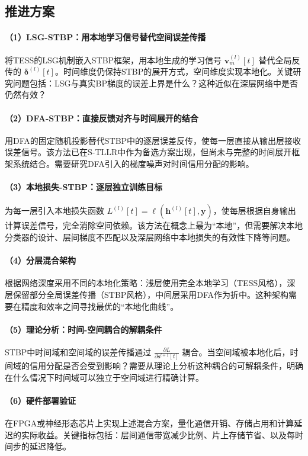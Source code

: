 \documentclass[journal,12pt,onecolumn]{IEEEtran}
\begin{document}
\subsection{推进方案}

\paragraph{（1）LSG-STBP：用本地学习信号替代空间误差传播}
将TESS的LSG机制嵌入STBP框架，用本地生成的学习信号 \(\mathbf{v}_m^{(l)}[t]\) 替代全局反传的 \(\boldsymbol{\delta}^{(l)}[t]\)。时间维度仍保持STBP的展开方式，空间维度实现本地化。关键研究问题包括：LSG与真实BP梯度的误差上界是什么？这种近似在深层网络中是否仍然有效？

\paragraph{（2）DFA-STBP：直接反馈对齐与时间展开的结合}
用DFA的固定随机投影替代STBP中的逐层误差反传，使每一层直接从输出层接收误差信号。该方法已在S-TLLR中作为备选方案出现，但尚未与完整的时间展开框架系统结合。需要研究DFA引入的梯度噪声对时间信用分配的影响。

\paragraph{（3）本地损失-STBP：逐层独立训练目标}
为每一层引入本地损失函数 \(L^{(l)}[t] = \ell(\mathbf{h}^{(l)}[t], \mathbf{y})\)，使每层根据自身输出计算误差信号，完全消除空间依赖。该方法在概念上最为“本地”，但需要解决本地分类器的设计、层间梯度不匹配以及深层网络中本地损失的有效性下降等问题。

\paragraph{（4）分层混合架构}
根据网络深度采用不同的本地化策略：浅层使用完全本地学习（TESS风格），深层保留部分全局误差传播（STBP风格），中间层采用DFA作为折中。这种架构需要在精度和效率之间寻找最优的“本地化曲线”。

\paragraph{（5）理论分析：时间-空间耦合的解耦条件}
STBP中时间域和空间域的误差传播通过 \(\frac{\partial L}{\partial \mathbf{s}^{l+1}[t]}\) 耦合。当空间域被本地化后，时间域的信用分配是否会受到影响？需要从理论上分析这种耦合的可解耦条件，明确在什么情况下时间域可以独立于空间域进行精确计算。

\paragraph{（6）硬件部署验证}
在FPGA或神经形态芯片上实现上述混合方案，量化通信开销、存储占用和计算延迟的实际收益。关键指标包括：层间通信带宽减少比例、片上存储节省、以及每时间步的延迟降低。
\end{document}
